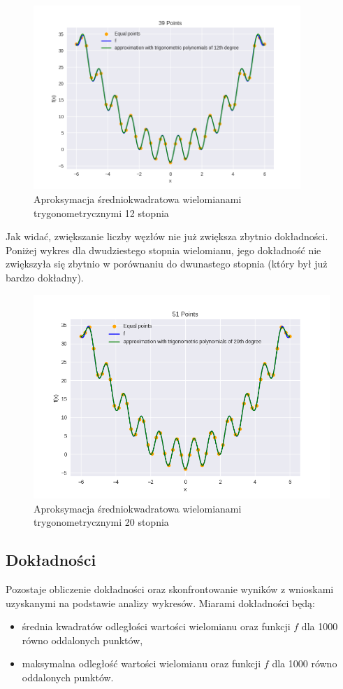 \documentclass{article}
\begin{document}
\begin{figure}[H]
    \centering
    \includegraphics[width=0.9\textwidth]{img/tripoly_12_39.png}
    \caption{Aproksymacja średniokwadratowa wielomianami trygonometrycznymi 12 stopnia}
\end{figure}

Jak widać, zwiększanie liczby węzłów nie już zwiększa zbytnio dokładności. Poniżej wykres dla dwudziestego stopnia wielomianu,
jego dokładność nie zwiększyła się zbytnio w porównaniu do dwunastego stopnia (który był już bardzo dokładny).

\begin{figure}[H]
    \centering
    \includegraphics[width=\textwidth]{img/tripoly_20_51.png}
    \caption{Aproksymacja średniokwadratowa wielomianami trygonometrycznymi 20 stopnia}
\end{figure}

\subsection{Dokładności}
Pozostaje obliczenie dokładności oraz skonfrontowanie wyników z wnioskami uzyskanymi na podstawie analizy wykresów. Miarami dokładności będą:
\begin{itemize}
    \item
    średnia kwadratów odległości wartości wielomianu oraz funkcji $f$ dla 1000 równo oddalonych punktów,
    \item
    maksymalna odległość wartości wielomianu oraz funkcji $f$ dla 1000 równo oddalonych punktów.
\end{itemize}
\end{document}
